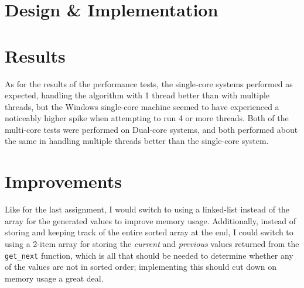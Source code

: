 \documentclass[12pt]{article}
\begin{document}
\section*{Design \& Implementation}


\section*{Results}
As for the results of the performance tests, the single-core systems performed as expected, handling the algorithm with 1 thread better than with multiple threads, but the Windows single-core machine seemed to have experienced a noticeably higher spike when attempting to run 4 or more threads. Both of the multi-core tests were performed on Dual-core systems, and both performed about the same in handling multiple threads better than the single-core system.


\section*{Improvements}
Like for the last assignment, I would switch to using a linked-list instead of the array for the generated values to improve memory usage. Additionally, instead of storing and keeping
track of the entire sorted array at the end, I could switch to using a 2-item array for storing the \textsl{current} and \textsl{previous} values returned from the \texttt{get_next} function,
which is all that should be needed to determine whether any of the values are not in sorted order; implementing this should cut down on memory usage a great deal.
\end{document}
